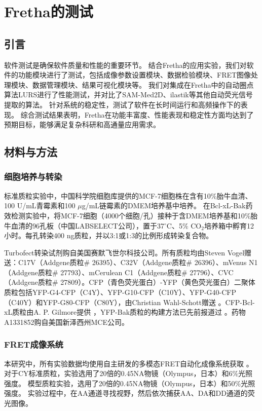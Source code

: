\chapter{Fretha的测试}

\section{引言}
软件测试是确保软件质量和性能的重要环节。
结合Fretha的应用实验，我们对软件的功能模块进行了测试，包括成像参数设置模块、数据检验模块、FRET图像处理模块、数据管理模块、结果可视化模块等。
我们对集成在Fretha中的自动圈点算法LURS进行了性能测试，并对比了SAM-Med2D、ilastik等其他自动荧光信号提取的算法。
针对系统的稳定性，测试了软件在长时间运行和高频操作下的表现。
综合测试结果表明，Fretha在功能丰富度、性能表现和稳定性方面均达到了预期目标，能够满足复杂科研和高通量应用需求。

\section{材料与方法}
\subsection{细胞培养与转染}
\label{sec:细胞质粒}
标准质粒实验中，中国科学院细胞库提供的MCF-7细胞株在含有10\%胎牛血清、100 U/mL青霉素和100 $\mu$g/mL链霉素的DMEM培养基中培养。
在Bcl-xL-Bak药效检测实验中，将MCF-7细胞（4000个细胞/孔）接种于含DMEM培养基和10\%胎牛血清的96孔板（中国LABSELECT公司），置于37$^\circ \text{C}$、5\% $\text{CO}_2$培养箱中孵育12小时。每孔转染400 ng质粒，并以3:1或1:3的比例形成转染复合物。

Turbofect\texttrademark{}转染试剂购自美国赛默飞世尔科技公司。所有质粒均由Steven Vogel赠送：C17V（Addgene质粒\# 26395）、C32V（Addgene质粒\# 26396）、mVenus N1（Addgene质粒\# 27793）、mCerulean C1（Addgene质粒\# 27796）、CVC（Addgene质粒\# 27809）。CFP（青色荧光蛋白）-YFP（黄色荧光蛋白）二聚体质粒包括YFP-G4-CFP（C4Y）、YFP-G10-CFP（C10Y）、YFP-G40-CFP（C40Y）和YFP-G80-CFP（C80Y），由Christian Wahl-Schott赠送 。CFP-Bcl-xL质粒由A. P. Gilmore提供 ，YFP-Bak质粒的构建方法已先前报道过 。药物A1331852购自美国新泽西州MCE公司。

\subsection{FRET成像系统}
\label{sec:成像条件}
\ifshowtext
本研究中，所有实验数据均使用自主研发的多模态FRET自动化成像系统获取 。
对于CY标准质粒，实验选用了20倍的0.45NA物镜（Olympus，日本）和6\%光照强度。
模型质粒实验，选用了20倍的0.45NA物镜（Olympus，日本）和50\%光照强度。
实验过程中，在AA通道寻找视野，然后依次捕获AA、DA和DD通道的荧光图像。

